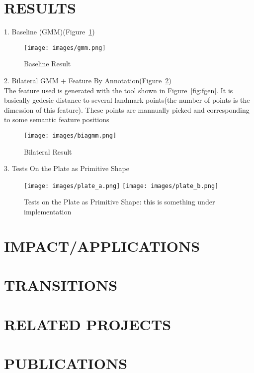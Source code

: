 \documentclass{onrannual}
\begin{document}
\section{RESULTS}
1. Baseline (GMM)(Figure~\ref{fig:gmm})\\
\begin{figure}
	\begin{center}
		\texttt{[image: images/gmm.png]}
	\end{center}
	\caption{Baseline Result}
	\label{fig:gmm}
\end{figure}
2. Bilateral GMM + Feature By Annotation(Figure~\ref{fig:biagmm})\\
The feature used is generated with the tool shown in Figure~\ref{fig:fgen}. It is basically gedesic distance to several landmark points(the number of points is the dimession of this feature). These points are mannually picked and corresponding to some semantic feature positions\\
\begin{figure}
	\begin{center}
		\texttt{[image: images/biagmm.png]}
	\end{center}
	\caption{Bilateral Result}
	\label{fig:biagmm}
\end{figure}
3. Tests On the Plate as Primitive Shape
\begin{figure}
	\texttt{[image: images/plate\_a.png]}
	\texttt{[image: images/plate\_b.png]}
	\caption{Tests on the Plate as Primitive Shape: this is something under implementation}
	\label{fig:plate}
\end{figure}
\section{IMPACT/APPLICATIONS}

\section{TRANSITIONS}

\section{RELATED PROJECTS}

\section{PUBLICATIONS}
\end{document}

